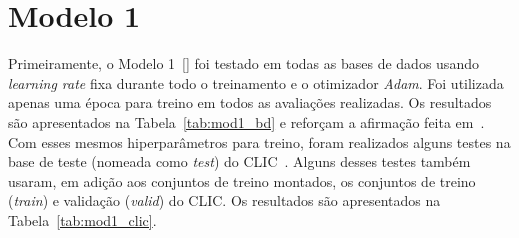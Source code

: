 \section{Modelo 1}
\label{res:mod1}
Primeiramente, o Modelo 1~[] foi testado em todas as bases de dados usando \textit{learning rate} fixa durante todo o treinamento e o otimizador \textit{Adam}. Foi utilizada apenas uma época para treino em todos as avaliações realizadas. Os resultados são apresentados na Tabela~\ref{tab:mod1_bd} e reforçam a afirmação feita em~\cite{FullResolution2017Toderici}. Com esses mesmos hiperparâmetros para treino, foram realizados alguns testes na base de teste (nomeada como \textit{test}) do \acrshort{CLIC}~\cite{clic}. Alguns desses testes também usaram, em adição aos conjuntos de treino montados, os conjuntos de treino (\textit{train}) e validação (\textit{valid}) do \acrshort{CLIC}. Os resultados são apresentados na Tabela~\ref{tab:mod1_clic}.

